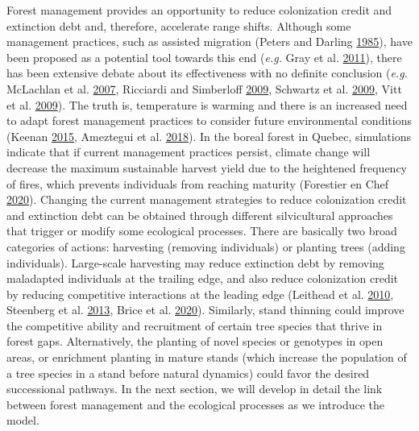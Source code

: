 \documentclass[12pt]{article}
\begin{document}
Forest management provides an opportunity to reduce colonization credit
and extinction debt and, therefore, accelerate range shifts. Although
some management practices, such as assisted migration (Peters and
Darling \protect\hyperlink{ref-Peters1985a}{1985}), have been proposed
as a potential tool towards this end (\emph{e.g.} Gray et al.
\protect\hyperlink{ref-Gray2011}{2011}), there has been extensive debate
about its effectiveness with no definite conclusion (\emph{e.g.}
McLachlan et al. \protect\hyperlink{ref-McLachlan2007}{2007}, Ricciardi
and Simberloff \protect\hyperlink{ref-Ricciardi2009}{2009}, Schwartz et
al. \protect\hyperlink{ref-Schwartz2009}{2009}, Vitt et al.
\protect\hyperlink{ref-Vila2010}{2009}). The truth is, temperature is
warming and there is an increased need to adapt forest management
practices to consider future environmental conditions (Keenan
\protect\hyperlink{ref-Keenan2015}{2015}, Ameztegui et al.
\protect\hyperlink{ref-Ameztegui2018}{2018}). In the boreal forest in
Quebec, simulations indicate that if current management practices
persist, climate change will decrease the maximum sustainable harvest
yield due to the heightened frequency of fires, which prevents
individuals from reaching maturity (Forestier en Chef
\protect\hyperlink{ref-BureauduForestierenChef2020}{2020}). Changing the
current management strategies to reduce colonization credit and
extinction debt can be obtained through different silvicultural
approaches that trigger or modify some ecological processes. There are
basically two broad categories of actions: harvesting (removing
individuals) or planting trees (adding individuals). Large-scale
harvesting may reduce extinction debt by removing maladapted individuals
at the trailing edge, and also reduce colonization credit by reducing
competitive interactions at the leading edge (Leithead et al.
\protect\hyperlink{ref-Leithead2010}{2010}, Steenberg et al.
\protect\hyperlink{ref-Steenberg2013}{2013}, Brice et al.
\protect\hyperlink{ref-Brice2020}{2020}). Similarly, stand thinning
could improve the competitive ability and recruitment of certain tree
species that thrive in forest gaps. Alternatively, the planting of novel
species or genotypes in open areas, or enrichment planting in mature
stands (which increase the population of a tree species in a stand
before natural dynamics) could favor the desired successional pathways.
In the next section, we will develop in detail the link between forest
management and the ecological processes as we introduce the model.
\end{document}
